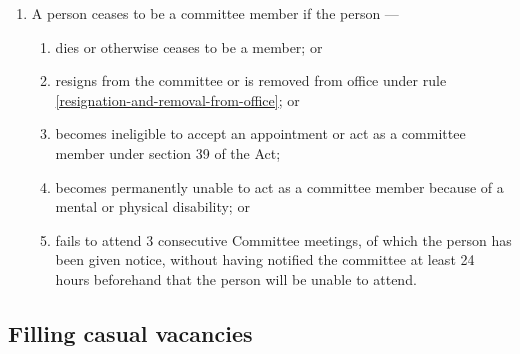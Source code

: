 \documentclass[../constitution.tex]{subfiles}
\begin{document}
\begin{enumerate}

\item A person ceases to be a committee member if the person ---

  \begin{enumerate}
  
  \item dies or otherwise ceases to be a member; or
  \item resigns from the committee or is removed from office under rule \ref{resignation-and-removal-from-office}; or
  \item becomes ineligible to accept an appointment or act as a committee member under section 39 of the Act;
  \item becomes permanently unable to act as a committee member because of a mental or physical disability; or
  \item fails to attend 3 consecutive Committee meetings, of which the person has been given notice, without having notified the committee at least 24 hours beforehand that the person will be unable to attend.
  \end{enumerate}
\end{enumerate}


\hypertarget{filling-casual-vacancies}{%
\subsection{Filling casual vacancies}\label{filling-casual-vacancies}}
\end{document}
